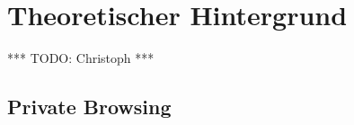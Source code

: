 \chapter{Theoretischer Hintergrund}

*** TODO: Christoph ***

%
%
\section{Private Browsing}
%
%		
%		
%	
%	
%
%	
